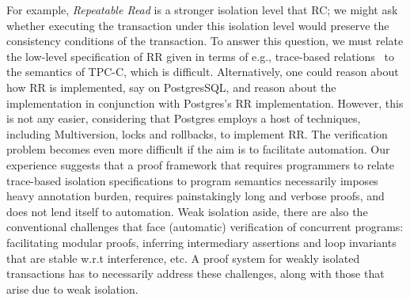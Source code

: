 

For example, \emph{Repeatable
  Read} is a stronger isolation level that RC; we might ask whether
executing the  transaction under this isolation level
would preserve the consistency conditions of the transaction.  To
answer this question, we must relate the low-level specification of RR
given in terms of e.g., trace-based
relations~\cite{adyaphd,gotsmanconcur15} to the semantics of TPC-C,
which is difficult.   Alternatively, one could reason about how RR is
implemented, say on PostgresSQL, and reason about the 
implementation in conjunction with Postgres's RR
implementation. However, this is not any easier, considering that
Postgres employs a host of techniques, including Multiversion, locks
and rollbacks, to implement RR. The verification problem becomes even
more difficult if the aim is to facilitate automation. Our experience
suggests that a proof framework that requires programmers to relate
trace-based isolation specifications to program semantics necessarily
imposes heavy annotation burden, requires painstakingly long and
verbose proofs, and does not lend itself to automation. Weak isolation
aside, there are also the conventional challenges that face
(automatic) verification of concurrent programs: facilitating modular
proofs, inferring intermediary assertions and loop invariants that are
stable w.r.t interference, etc. A proof system for weakly isolated
transactions has to necessarily address these challenges, along with
those that arise due to weak isolation.
